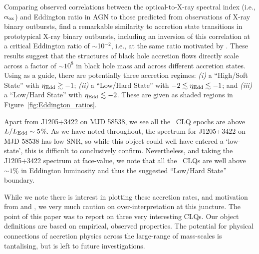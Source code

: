 \documentclass[fleqn,usenatbib]{mnras}
\begin{document}
Comparing observed correlations between the optical-to-X-ray spectral
index (i.e., $\alpha_{\rm ox}$) and Eddington ratio in AGN to those
predicted from observations of X-ray binary outbursts,
\citet{Ruan2019a} find a remarkable similarity to accretion state
transitions in prototypical X-ray binary outbursts, including an
inversion of this correlation at a critical Eddington ratio of
$\sim$10$^{-2}$, i.e., at the same ratio motivated by
\citet{NodaDone2018}.  These results suggest that the structures of
black hole accretion flows directly scale across a factor of
$\sim10^{8}$ in black hole mass and across different accretion
states. Using \citet{Ruan2019a} as a guide, there are potentially
three accretion regimes: {\it (i)} a ``High/Soft State'' with
$\eta_{\rm Edd} \gtrsim -1$; {\it (ii)} a ``Low/Hard State'' with $-2
\lesssim \eta_{\rm Edd} \lesssim -1$; and {\it (iii)} a ``Low/Hard
State'' with $\eta_{\rm Edd} \lesssim -2$.  These are given as shaded
regions in Figure~\ref{fig:Eddington_ratios}.

Apart from J1205+3422 on MJD 58538, we see all the \civ\ CLQ epochs
are above $L / L_{\rm Edd} \sim 5$\%. As we have noted throughout, the
spectrum for J1205+3422 on MJD 58538 has low SNR, so while this object
could well have entered a `low-state', this is difficult to
conclusively confirm.  Nevertheless, and taking the J1205+3422
spectrum at face-value, we note that all the \civ\ CLQs are well above
$\sim1\%$ in Eddington luminosity and thus the suggested ``Low/Hard
State'' boundary.

While we note there is interest in plotting these accretion rates, and
motivation from \citet{NodaDone2018} and \citet{Ruan2019a}, we very
much caution on over-interpretation at this juncture. The point of
this paper was to report on three very interesting CLQs.  Our object
definitions are based on empirical, observed properties.  The
potential for physical connections of accretion physics across the
large-range of mass-scales is tantalising, but is left to future
investigations.



\end{document}
